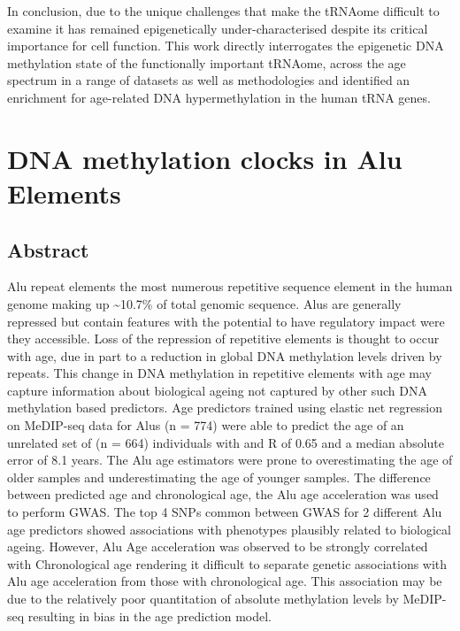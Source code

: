 \documentclass[
]{book}
\begin{document}
In conclusion, due to the unique challenges that make the tRNAome difficult to examine it has remained epigenetically under-characterised despite its critical importance for cell function.
This work directly interrogates the epigenetic DNA methylation state of the functionally important tRNAome, across the age spectrum in a range of datasets as well as methodologies and identified an enrichment for age-related DNA hypermethylation in the human tRNA genes.

\newpage

\hypertarget{Alus}{%
\chapter{DNA methylation clocks in Alu Elements}\label{Alus}}

\hypertarget{Alu-Abstract}{%
\section{Abstract}\label{Alu-Abstract}}

Alu repeat elements the most numerous repetitive sequence element in the human genome making up \textasciitilde10.7\% of total genomic sequence.
Alus are generally repressed but contain features with the potential to have regulatory impact were they accessible.
Loss of the repression of repetitive elements is thought to occur with age, due in part to a reduction in global DNA methylation levels driven by repeats.
This change in DNA methylation in repetitive elements with age may capture information about biological ageing not captured by other such DNA methylation based predictors.
Age predictors trained using elastic net regression on MeDIP-seq data for Alus (n = 774)
were able to predict the age of an unrelated set of (n = 664) individuals with and R of 0.65 and a median absolute error of 8.1 years.
The Alu age estimators were prone to overestimating the age of older samples and underestimating the age of younger samples.
The difference between predicted age and chronological age, the Alu age acceleration was used to perform GWAS.
The top 4 SNPs common between GWAS for 2 different Alu age predictors showed associations with phenotypes plausibly related to biological ageing.
However, Alu Age acceleration was observed to be strongly correlated with Chronological age rendering it difficult to separate genetic associations with Alu age acceleration from those with chronological age.
This association may be due to the relatively poor quantitation of absolute methylation levels by MeDIP-seq resulting in bias in the age prediction model.
\end{document}
